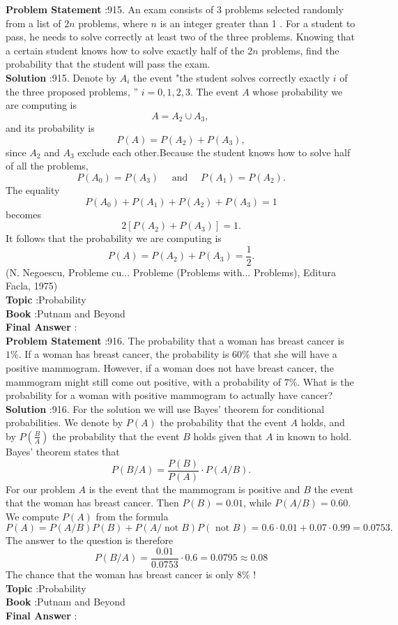 \documentclass[10pt]{article}
\begin{document}
\textbf{Problem Statement} :915. An exam consists of 3 problems selected randomly from a list of $2 n$ problems, where $n$ is an integer greater than 1 . For a student to pass, he needs to solve correctly at least two of the three problems. Knowing that a certain student knows how to solve exactly half of the $2 n$ problems, find the probability that the student will pass the exam.\\
\textbf{Solution} :915. Denote by $A_{i}$ the event "the student solves correctly exactly $i$ of the three proposed problems, '' $i=0,1,2,3$. The event $A$ whose probability we are computing is$$ A=A_{2} \cup A_{3} \text {, } $$and its probability is$$ P(A)=P\left(A_{2}\right)+P\left(A_{3}\right), $$since $A_{2}$ and $A_{3}$ exclude each other.Because the student knows how to solve half of all the problems,$$ P\left(A_{0}\right)=P\left(A_{3}\right) \quad \text { and } \quad P\left(A_{1}\right)=P\left(A_{2}\right) . $$The equality$$ P\left(A_{0}\right)+P\left(A_{1}\right)+P\left(A_{2}\right)+P\left(A_{3}\right)=1 $$becomes$$ 2\left[P\left(A_{2}\right)+P\left(A_{3}\right)\right]=1 . $$It follows that the probability we are computing is$$ P(A)=P\left(A_{2}\right)+P\left(A_{3}\right)=\frac{1}{2} . $$(N. Negoescu, Probleme cu... Probleme (Problems with... Problems), Editura Facla, 1975)\\
\textbf{Topic} :Probability\\
\textbf{Book} :Putnam and Beyond\\
\textbf{Final Answer} :\\


\textbf{Problem Statement} :916. The probability that a woman has breast cancer is $1 \%$. If a woman has breast cancer, the probability is $60 \%$ that she will have a positive mammogram. However, if a woman does not have breast cancer, the mammogram might still come out positive, with a probability of $7 \%$. What is the probability for a woman with positive mammogram to actually have cancer?\\
\textbf{Solution} :916. For the solution we will use Bayes' theorem for conditional probabilities. We denote by $P(A)$ the probability that the event $A$ holds, and by $P\left(\frac{B}{A}\right)$ the probability that the event $B$ holds given that $A$ in known to hold. Bayes' theorem states that $$ P(B / A)=\frac{P(B)}{P(A)} \cdot P(A / B) . $$For our problem $A$ is the event that the mammogram is positive and $B$ the event that the woman has breast cancer. Then $P(B)=0.01$, while $P(A / B)=0.60$. We compute $P(A)$ from the formula$$ P(A)=P(A / B) P(B)+P(A / \operatorname{not} B) P(\text { not } B)=0.6 \cdot 0.01+0.07 \cdot 0.99=0.0753 . $$The answer to the question is therefore$$ P(B / A)=\frac{0.01}{0.0753} \cdot 0.6=0.0795 \approx 0.08 $$The chance that the woman has breast cancer is only $8 \%$ !\\
\textbf{Topic} :Probability\\
\textbf{Book} :Putnam and Beyond\\
\textbf{Final Answer} :\\
\end{document}
